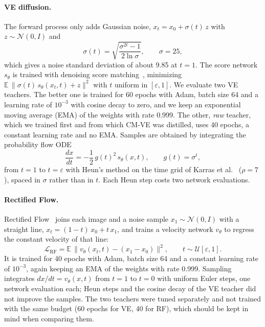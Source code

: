 \documentclass{article}
\begin{document}
\paragraph{VE diffusion.} The forward process only adds Gaussian noise,
$x_t = x_0 + \sigma(t)\,z$ with $z \sim \mathcal{N}(0, I)$ and
\begin{equation}
  \sigma(t) = \sqrt{\frac{\sigma^{2t} - 1}{2 \ln \sigma}}, \qquad \sigma = 25,
\end{equation}
which gives a noise standard deviation of about 9.85 at $t = 1$. The score
network $s_\theta$ is trained with denoising score
matching~\cite{song2021sde}, minimizing
$\mathbb{E}\,\|\sigma(t)\, s_\theta(x_t, t) + z\|^2$ with $t$ uniform in
$[\varepsilon, 1]$. We evaluate two VE teachers. The better one is trained for
60 epochs with Adam, batch size 64 and a learning rate of $10^{-3}$ with cosine
decay to zero, and we keep an exponential moving average (EMA) of the weights
with rate 0.999. The other, \emph{raw} teacher, which we trained first and from
which CM-VE was distilled, uses 40 epochs, a constant learning rate and no
EMA. Samples are obtained by integrating the probability flow ODE
\begin{equation}
  \frac{dx}{dt} = -\frac{1}{2}\, g(t)^2\, s_\theta(x, t), \qquad g(t) = \sigma^t,
\end{equation}
from $t = 1$ to $t = \varepsilon$ with Heun's method on the time grid of
Karras et al.~\cite{karras2022edm} ($\rho = 7$), spaced in $\sigma$ rather
than in $t$. Each Heun step costs two network evaluations.

\paragraph{Rectified Flow.} Rectified Flow~\cite{liu2023flow} joins each image
and a noise sample $x_1 \sim \mathcal{N}(0, I)$ with a straight line,
$x_t = (1 - t)\, x_0 + t\, x_1$, and trains a velocity network $v_\theta$ to
regress the constant velocity of that line:
\begin{equation}
  \mathcal{L}_\text{RF} = \mathbb{E}\,\big\| v_\theta(x_t, t) - (x_1 - x_0) \big\|^2,
  \qquad t \sim \mathcal{U}[\varepsilon, 1].
\end{equation}
It is trained for 40 epochs with Adam, batch size 64 and a constant learning
rate of $10^{-3}$, again keeping an EMA of the weights with rate 0.999.
Sampling integrates $dx/dt = v_\theta(x, t)$ from $t = 1$ to $t = 0$ with
uniform Euler steps, one network evaluation each; Heun steps and the cosine
decay of the VE teacher did not improve the samples. The two teachers were
tuned separately and not trained with the same budget (60 epochs for VE, 40
for RF), which should be kept in mind when comparing them.
\end{document}
